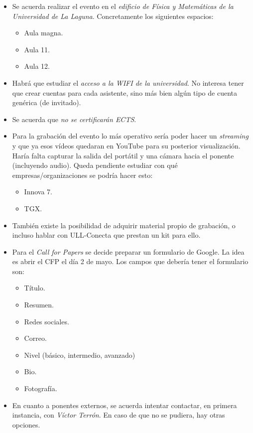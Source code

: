 \documentclass[a4paper, 12pt]{article}
\begin{document}
\begin{itemize}
    \item Se acuerda realizar el evento en el \textit{edificio de Física y Matemáticas de la Universidad de La Laguna}. Concretamente los siguientes espacios:
    \begin{itemize}
        \item Aula magna.
        \item Aula 11.
        \item Aula 12.
    \end{itemize}
    \item Habrá que estudiar el \textit{acceso a la WIFI de la universidad}. No interesa tener que crear cuentas para cada asistente, sino más bien algún tipo de cuenta genérica (de invitado).
    \item Se acuerda que \textit{no se certificarán ECTS}.
    \item Para la grabación del evento lo más operativo sería poder hacer un \textit{streaming} y que ya esos vídeos quedaran en YouTube para su posterior visualización. Haría falta capturar la salida del portátil y una cámara hacia el ponente (incluyendo audio). Queda pendiente estudiar con qué empresas/organizaciones se podría hacer esto:
    \begin{itemize}
        \item Innova 7.
        \item TGX.
    \end{itemize}
    \item También existe la posibilidad de adquirir material propio de grabación, o incluso hablar con ULL-Conecta que prestan un kit para ello.
    \item Para el \textit{Call for Papers} se decide preparar un formulario de Google. La idea es abrir el CFP el día 2 de mayo. Los campos que debería tener el formulario son:
    \begin{itemize}
        \item Título.
        \item Resumen.
        \item Redes sociales.
        \item Correo.
        \item Nivel (básico, intermedio, avanzado)
        \item Bio.
        \item Fotografía.
    \end{itemize}
    \item En cuanto a ponentes externos, se acuerda intentar contactar, en primera instancia, con \textit{Víctor Terrón}. En caso de que no se pudiera, hay otras opciones.

\end{itemize}
\end{document}
